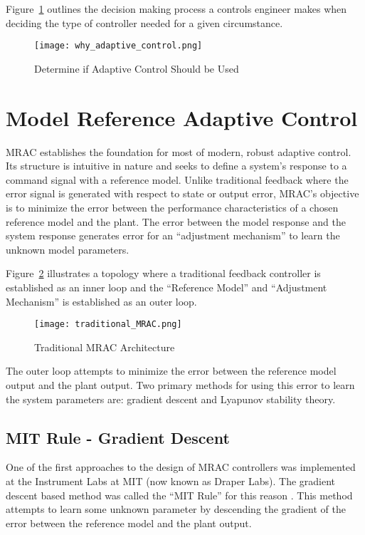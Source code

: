 Figure~\ref{fig:why_adaptive_control} outlines the decision making process a controls engineer makes when deciding the type of controller needed for a given circumstance.

\begin{figure}[h!]
 \centering
  \texttt{[image: why\_adaptive\_control.png]}
  \caption{Determine if Adaptive Control Should be Used}
  \label{fig:why_adaptive_control}
\end{figure}


\section{Model Reference Adaptive Control}
\ac{MRAC} establishes the foundation for most of modern, robust adaptive control.  Its structure is intuitive in nature and seeks to define a system's response to a command signal with a reference model.  Unlike traditional feedback where the error signal is generated with respect to state or output error, \ac{MRAC}'s objective is to minimize the error between the performance characteristics of a chosen reference model and the plant.  The error between the model response and the system response generates error for an \enquote{adjustment mechanism} to learn the unknown model parameters.

Figure~\ref{fig:traditional_mrac} illustrates a topology where a traditional feedback controller is established as an inner loop and the \enquote{Reference Model} and \enquote{Adjustment Mechanism} is established as an outer loop.
\begin{figure}[h!]
 \centering
  \texttt{[image: traditional\_MRAC.png]}
  \caption{Traditional \ac{MRAC} Architecture }
  \label{fig:traditional_mrac}
\end{figure}
The outer loop attempts to minimize the error between the reference model output and the plant output.  Two primary methods for using this error to learn the system parameters are: gradient descent and Lyapunov stability theory.

\subsection{MIT Rule - Gradient Descent}
One of the first approaches to the design of \ac{MRAC} controllers was implemented at the Instrument Labs at MIT (now known as Draper Labs).  The gradient descent based method was called the \enquote{MIT Rule} for this reason \cite{aastrom2013adaptive}.  This method attempts to learn some unknown parameter by descending the gradient of the error between the reference model and the plant output.

